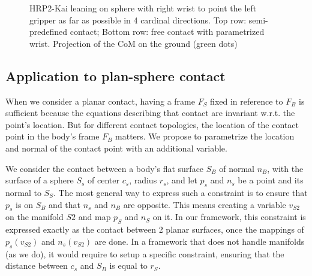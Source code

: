 \begin{figure}
\centering
  \centering
  \setlength\fboxsep{0pt}
  \setlength\fboxrule{1pt}
  \caption{HRP2-Kai leaning on sphere with right wrist to point the left gripper as far as possible in 4 cardinal directions. Top row: semi-predefined contact; Bottom row: free contact with parametrized wrist. Projection of the CoM on the ground (green dots)}
\label{fig:contact_plan_sphere}
\end{figure}

\subsection{Application to plan-sphere contact}
When we consider a planar contact, having a frame $F_{S}$ fixed in reference to $F_{B}$ is sufficient because the equations describing that contact are invariant w.r.t. the point's location.
But for different contact topologies, the location of the contact point in the body's frame $F_{B}$ matters.
We propose to parametrize the location and normal of the contact point with an additional variable.

We consider the contact between a body's flat surface $S_B$ of normal $n_B$, with the surface of a sphere $S_s$ of center $c_s$, radius $r_s$, and let $p_s$ and $n_s$ be a point and its normal to $S_S$.
The most general way to express such a constraint is to ensure that $p_s$ is on $S_B$ and that $n_s$ and $n_B$ are opposite.
This means creating a variable $v_{S2}$ on the manifold $S2$ and map $p_S$ and $n_S$ on it.
In our framework, this constraint is expressed exactly as the contact between 2 planar surfaces, once the mappings of $p_s(v_{S2})$ and $n_s(v_{S2})$ are done.
In a framework that does not handle manifolds (as we do), it would require to setup a specific constraint, ensuring that the distance between $c_s$ and $S_B$ is equal to $r_S$.

